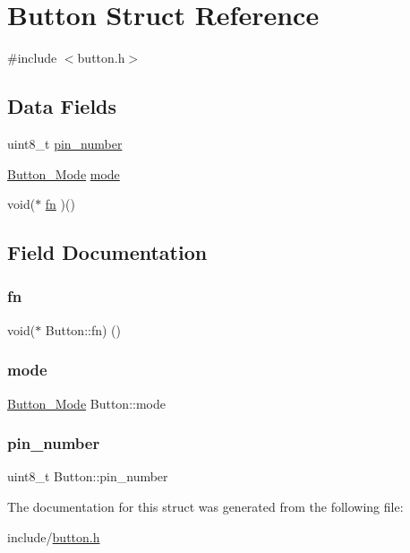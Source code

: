 \hypertarget{structButton}{}\section{Button Struct Reference}
\label{structButton}


{\ttfamily \#include $<$button.\+h$>$}

\subsection*{Data Fields}
\begin{DoxyCompactItemize}
\item 
uint8\+\_\+t \mbox{\hyperlink{structButton_af928b8cec60e2319e1a624edd40c878d}{pin\+\_\+number}}
\item 
\mbox{\hyperlink{button_8h_a9a185102e3c0ad41aac006e0e2fcb190}{Button\+\_\+\+Mode}} \mbox{\hyperlink{structButton_aef2b69645163f24a3c019f6695f08843}{mode}}
\item 
void($\ast$ \mbox{\hyperlink{structButton_a2eefdfa81c0be7bdd169a46cc9a0407a}{fn}} )()
\end{DoxyCompactItemize}


\subsection{Field Documentation}
\mbox{\label{structButton_a2eefdfa81c0be7bdd169a46cc9a0407a}} 
\subsubsection{\texorpdfstring{fn}{fn}}
{\footnotesize\ttfamily void($\ast$ Button\+::fn) ()}

\mbox{\label{structButton_aef2b69645163f24a3c019f6695f08843}} 
\subsubsection{\texorpdfstring{mode}{mode}}
{\footnotesize\ttfamily \mbox{\hyperlink{button_8h_a9a185102e3c0ad41aac006e0e2fcb190}{Button\+\_\+\+Mode}} Button\+::mode}

\mbox{\label{structButton_af928b8cec60e2319e1a624edd40c878d}} 
\subsubsection{\texorpdfstring{pin\+\_\+number}{pin\_number}}
{\footnotesize\ttfamily uint8\+\_\+t Button\+::pin\+\_\+number}



The documentation for this struct was generated from the following file\+:\begin{DoxyCompactItemize}
\item 
include/\mbox{\hyperlink{button_8h}{button.\+h}}\end{DoxyCompactItemize}
